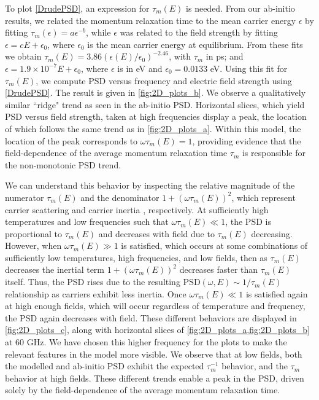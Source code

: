 \documentclass[aps,prx,preprint,letterpaper,groupedaddress,longbibliography]{revtex4-2}
\theoremstyle{definition}
\newcommand{\smalleunits}{V cm\textsuperscript{-1}}
\begin{document}
To plot \cref{DrudePSD}, an  expression for $\tau_m(E)$ is needed. From our ab-initio results, we related the momentum relaxation time to the mean carrier energy $\epsilon$ by fitting $\tau_m(\epsilon)=a\epsilon^{-b}$, while $\epsilon$ was related to the field strength by fitting $\epsilon=cE+\epsilon_0$, where $\epsilon_0$ is the mean carrier energy at equilibrium. From these fits we obtain $\tau_m(E)=3.86 \left(\epsilon(E)/\epsilon_0\right)^{-2.46}$, with $\tau_m$ in ps; and $\epsilon=1.9 \times  10^{-7} E + \epsilon_0$, where $\epsilon$ is in eV and $\epsilon_0=0.0133$ eV. Using this fit for $\tau_m(E)$, we compute PSD versus frequency and electric field strength using \cref{DrudePSD}. The result is given in \cref{fig:2D_plots_b}. We observe a qualitatively similar ``ridge" trend as seen in the ab-initio PSD. Horizontal slices, which yield PSD versus field strength, taken at high frequencies display a peak, the location of which follows the same trend as in \cref{fig:2D_plots_a}. Within this model, the location of the peak corresponds to $\omega\tau_m(E)=1$, providing evidence that the field-dependence of the average momentum relaxation time $\tau_m$ is responsible for the non-monotonic PSD trend.\par


We can understand this behavior by inspecting the relative magnitude of the numerator $\tau_m(E)$ and the denominator $1+\left(\omega\tau_m(E)\right)^2$, which represent carrier scattering and carrier inertia \cite{Champlin:1964}, respectively. At sufficiently high temperatures and low frequencies such that $\omega\tau_m(E) \ll 1$, the PSD is proportional to $\tau_m(E)$ and decreases with field due to $\tau_m(E)$ decreasing. However, when $\omega\tau_m(E) \gg 1$ is satisfied, which occurs at some combinations of sufficiently low temperatures, high frequencies, and low fields, then as $\tau_m(E)$ decreases the inertial term $1+\left(\omega\tau_m(E)\right)^2$ decreases faster than $\tau_m(E)$ itself. Thus, the PSD rises due to the resulting $\mathrm{PSD}(\omega,E)\sim1/\tau_m(E)$ relationship as carriers exhibit less inertia. Once $\omega\tau_m(E) \ll 1$ is satisfied again at high enough fields, which will occur regardless of temperature and frequency, the PSD again decreases with field. These different behaviors are displayed in \cref{fig:2D_plots_c}, along with horizontal slices of \cref{fig:2D_plots_a,fig:2D_plots_b} at 60 GHz. We have chosen this higher frequency for the plots to make the relevant features in the model more visible. We observe that at low fields, both the modelled and ab-initio PSD exhibit the expected $\tau_m^{-1}$ behavior, and the $\tau_m$ behavior at high fields. These different trends enable a peak in the PSD, driven solely by the field-dependence of the average momentum relaxation time.\par
\end{document}
